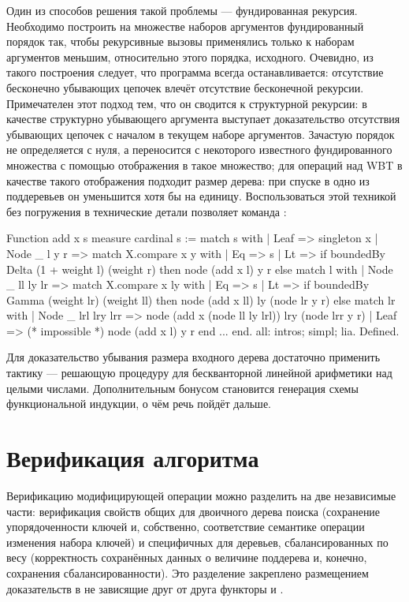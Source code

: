 \documentclass[a4paper,14pt]{extarticle}
\begin{document}
Один из способов решения такой проблемы ---
фундированная рекурсия.
Необходимо построить на множестве наборов аргументов
фундированный порядок так,
чтобы рекурсивные вызовы применялись
только к наборам аргументов меньшим,
относительно этого порядка, исходного.
Очевидно, из такого построения
следует, что программа всегда останавливается:
отсутствие бесконечно убывающих цепочек
влечёт отсутствие бесконечной рекурсии.
Примечателен этот подход тем,
что он сводится к структурной рекурсии:
в качестве структурно убывающего аргумента
выступает доказательство отсутствия
убывающих цепочек с началом в текущем наборе аргументов.
Зачастую порядок не определяется с нуля,
а переносится с некоторого известного фундированного множества
с помощью отображения в такое множество;
для операций над WBT
в качестве такого отображения подходит
размер дерева: при спуске в одно из поддеревьев
он уменьшится хотя бы на единицу.
Воспользоваться этой техникой без погружения в технические детали
позволяет команда :

\begin{coqcode}

Function add x s {measure cardinal s} := match s with
| Leaf => singleton x
| Node _ l y r =>
  match X.compare x y with
  | Eq => s
  | Lt =>
    if boundedBy Delta (1 + weight l) (weight r)
    then node (add x l) y r
    else match l with
    | Node _ ll ly lr =>
      match X.compare x ly with
      | Eq => s
      | Lt =>
        if boundedBy Gamma (weight lr) (weight ll)
        then node (add x ll) ly (node lr y r)
        else match lr with
        | Node _ lrl lry lrr =>
          node (add x (node ll ly lrl)) lry (node lrr y r)
        | Leaf => (* impossible *) node (add x l) y r
        end
      ...
end.
all: intros; simpl; lia. Defined.

\end{coqcode}

Для доказательство убывания размера входного дерева
достаточно применить тактику  ---
решающую процедуру для бескванторной линейной арифметики
над целыми числами\cite{micromega}.
Дополнительным бонусом становится генерация схемы функциональной
индукции, о чём речь пойдёт дальше.

\clearpage
\section{Верификация алгоритма}

Верификацию модифицирующей операции можно разделить
на две независимые части:
верификация свойств общих для двоичного дерева поиска
(сохранение упорядоченности ключей и, собственно,
соответствие семантике операции изменения набора ключей)
и специфичных для деревьев, сбалансированных по весу
(корректность сохранённых данных о величине поддерева
и, конечно, сохранения сбалансированности).
Это разделение закреплено размещением
доказательств в не зависящие друг от друга функторы
 и .
\end{document}
